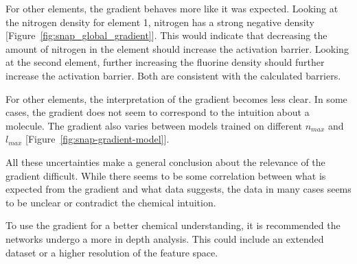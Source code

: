 For other elements, the gradient behaves more like it was expected.
Looking at the nitrogen density for element 1, nitrogen has a strong negative density [Figure~\ref{fig:snap_global_gradient}].
This would indicate that decreasing the amount of nitrogen in the element should increase the activation barrier.
Looking at the second element, further increasing the fluorine density should further increase the activation barrier.
Both are consistent with the calculated barriers.

For other elements, the interpretation of the gradient becomes less clear.
In some cases, the gradient does not seem to correspond to the intuition about a molecule.
The gradient also varies between models trained on different $n_{max}$ and $l_{max}$ [Figure~\ref{fig:snap-gradient-model}].


All these uncertainties make a general conclusion about the relevance of the gradient difficult.
While there seems to be some correlation between what is expected from the gradient and what data suggests, 
the data in many cases seems to be unclear or contradict the chemical intuition.

To use the gradient for a better chemical understanding, it is recommended the networks undergo a more in depth analysis.
This could include an extended dataset or a higher resolution of the feature space.

